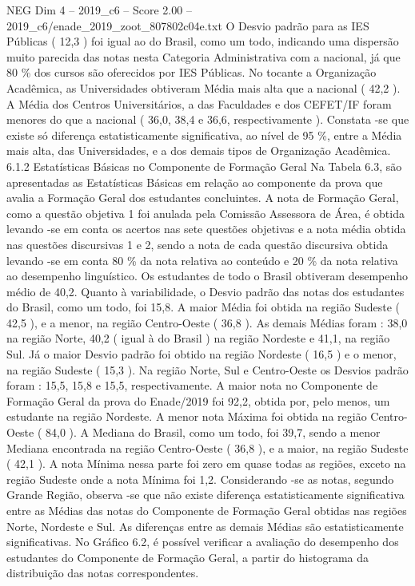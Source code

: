 \begin{textsample}{NEG Dim 4 – 2019\_c6 – Score 2.00 – 2019\_c6/enade\_2019\_zoot\_807802c04e.txt}
O Desvio padrão para as IES Públicas ( 12,3 ) foi igual ao do Brasil, como um todo, indicando uma dispersão muito parecida das notas nesta Categoria Administrativa com a nacional, já que 80 \% dos cursos são oferecidos por IES Públicas.
No tocante a Organização Acadêmica, as Universidades obtiveram Média mais alta que a nacional ( 42,2 ).
A Média dos Centros Universitários, a das Faculdades e dos CEFET/IF foram menores do que a nacional ( 36,0, 38,4 e 36,6, respectivamente ).
Constata -se que existe só diferença estatisticamente significativa, ao nível de 95 \%, entre a Média mais alta, das Universidades, e a dos demais tipos de Organização Acadêmica. 6.1.2 Estatísticas Básicas no Componente de Formação Geral Na Tabela 6.3, são apresentadas as Estatísticas Básicas em relação ao componente da prova que avalia a Formação Geral dos estudantes concluintes.
A nota de Formação Geral, como a questão objetiva 1 foi anulada pela Comissão Assessora de Área, é obtida levando -se em conta os acertos nas sete questões objetivas e a nota média obtida nas questões discursivas 1 e 2, sendo a nota de cada questão discursiva obtida levando -se em conta 80 \% da nota relativa ao conteúdo e 20 \% da nota relativa ao desempenho linguístico.
Os estudantes de todo o Brasil obtiveram desempenho médio de 40,2.
Quanto à variabilidade, o Desvio padrão das notas dos estudantes do Brasil, como um todo, foi 15,8.
A maior Média foi obtida na região Sudeste ( 42,5 ), e a menor, na região Centro-Oeste ( 36,8 ).
As demais Médias foram : 38,0 na região Norte, 40,2 ( igual à do Brasil ) na região Nordeste e 41,1, na região Sul.
Já o maior Desvio padrão foi obtido na região Nordeste ( 16,5 ) e o menor, na região Sudeste ( 15,3 ).
Na região Norte, Sul e Centro-Oeste os Desvios padrão foram : 15,5, 15,8 e 15,5, respectivamente.
A maior nota no Componente de Formação Geral da prova do Enade/2019 foi 92,2, obtida por, pelo menos, um estudante na região Nordeste.
A menor nota Máxima foi obtida na região Centro-Oeste ( 84,0 ).
A Mediana do Brasil, como um todo, foi 39,7, sendo a menor Mediana encontrada na região Centro-Oeste ( 36,8 ), e a maior, na região Sudeste ( 42,1 ).
A nota Mínima nessa parte foi zero em quase todas as regiões, exceto na região Sudeste onde a nota Mínima foi 1,2.
Considerando -se as notas, segundo Grande Região, observa -se que não existe diferença estatisticamente significativa entre as Médias das notas do Componente de Formação Geral obtidas nas regiões Norte, Nordeste e Sul.
As diferenças entre as demais Médias são estatisticamente significativas.
No Gráfico 6.2, é possível verificar a avaliação do desempenho dos estudantes do Componente de Formação Geral, a partir do histograma da distribuição das notas correspondentes.

\end{textsample}
